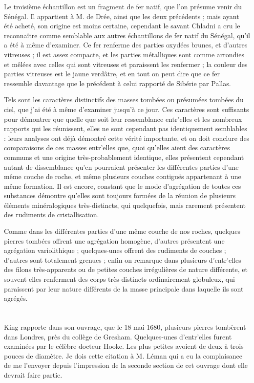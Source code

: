 \documentclass[a4paper, 12pt, oneside, french]{article}
\begin{document}
Le troisième échantillon est un fragment de fer natif, que l'on présume venir du Sénégal. Il appartient à M. de Drée, ainsi que les deux précédents ; mais ayant été acheté, son origine est moins certaine, cependant le savant Chladni a cru le reconnaître comme semblable aux autres échantillons de fer natif du Sénégal, qu'il a été à même d'examiner. Ce fer renferme des parties oxydées brunes, et d'autres vitreuses ; il est assez compacte, et les parties métalliques sont comme arrondies et mêlées avec celles qui sont vitreuses et paraissent les renfermer ; la couleur des parties vitreuses est le jaune verdâtre, et en tout on peut dire que ce fer ressemble davantage que le précédent à celui rapporté de Sibérie par Pallas.

Tels sont les caractères distinctifs des masses tombées ou présumées tombées du ciel, que j'ai été à même d'examiner jusqu'à ce jour. Ces caractères sont suffisants pour démontrer que quelle que soit leur ressemblance entr'elles et les nombreux rapports qui les réunissent, elles ne sont cependant pas identiquement semblables : leurs analyses ont déjà démontré cette vérité importante, et on doit conclure des comparaisons de ces masses entr'elles que, quoi qu’elles aient des caractères communs et une origine très-probablement identique, elles présentent cependant autant de dissemblance qu'en pourraient présenter les différentes parties d'une même couche de roche, et même plusieurs couches contiguës appartenant à une même formation. Il est encore, constant que le mode d'agrégation de toutes ces substances démontre qu'elles sont toujours formées de la réunion de plusieurs éléments minéralogiques très-distincts, qui quelquefois, mais rarement présentent des rudiments de cristallisation.

Comme dans les différentes parties d'une même couche de nos roches, quelques pierres tombées offrent une agrégation homogène, d'autres présentent une agrégation variolithique ; quelques-unes offrent des rudiments de couches ; d'autres sont totalement grenues ; enfin on remarque dans plusieurs d'entr'elles des filons très-apparents ou de petites couches irrégulières de nature différente, et souvent elles renferment des corps très-distincts ordinairement globuleux, qui paraissent par leur nature différents de la masse principale dans laquelle ils sont agrégés.
\clearpage
\section{}
\paragraph{}
King rapporte dans son ouvrage, que le 18 mai 1680, plusieurs pierres tombèrent dans Londres, près du collège de Gresham. Quelques-unes d'entr'elles furent examinées par le célèbre docteur Hooke. Les plus petites avoient de deux à trois pouces de diamètre. Je dois cette citation à M. Léman qui a eu la complaisance de me l'envoyer depuis l'impression de la seconde section de cet ouvrage dont elle devrait faire partie.
\end{document}
